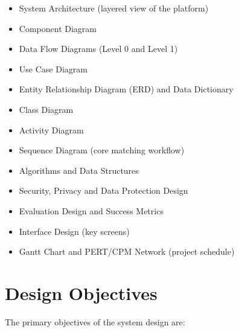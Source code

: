 \documentclass[12pt,a4paper]{report}
\begin{document}
\begin{itemize}[noitemsep]
    \item System Architecture (layered view of the platform)
    \vspace{1mm}
    \item Component Diagram
    \vspace{1mm}
    \item Data Flow Diagrams (Level 0 and Level 1)
    \vspace{1mm}
    \item Use Case Diagram
    \vspace{1mm}
    \item Entity Relationship Diagram (ERD) and Data Dictionary
    \vspace{1mm}
    \item Class Diagram
    \vspace{1mm}
    \item Activity Diagram
    \vspace{1mm}
    \item Sequence Diagram (core matching workflow)
    \vspace{1mm}
    \item Algorithms and Data Structures
    \vspace{1mm}
    \item Security, Privacy and Data Protection Design
    \vspace{1mm}
    \item Evaluation Design and Success Metrics
    \vspace{1mm}
    \item Interface Design (key screens)
    \vspace{1mm}
    \item Gantt Chart and PERT/CPM Network (project schedule)
\end{itemize}

\section{Design Objectives}

The primary objectives of the system design are:
\end{document}
